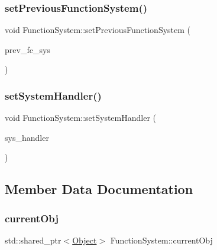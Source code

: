 \mbox{\label{classFunctionSystem_a2304a8ecdf5ddad124779b75be69f4a1}} 
\subsubsection{\texorpdfstring{set\+Previous\+Function\+System()}{setPreviousFunctionSystem()}}
{\footnotesize\ttfamily void Function\+System\+::set\+Previous\+Function\+System (\begin{DoxyParamCaption}\item[{\hyperlink{classFunctionSystem}{Function\+System} $\ast$}]{prev\+\_\+fc\+\_\+sys }\end{DoxyParamCaption})}

\mbox{\label{classFunctionSystem_a7924e14b5794c595167aa9d547182883}} 
\subsubsection{\texorpdfstring{set\+System\+Handler()}{setSystemHandler()}}
{\footnotesize\ttfamily void Function\+System\+::set\+System\+Handler (\begin{DoxyParamCaption}\item[{\hyperlink{classSystemHandler}{System\+Handler} $\ast$}]{sys\+\_\+handler }\end{DoxyParamCaption})}



\subsection{Member Data Documentation}
\mbox{\label{classFunctionSystem_a59f2a49d91338ced0a79d3898412fcaf}} 
\subsubsection{\texorpdfstring{current\+Obj}{currentObj}}
{\footnotesize\ttfamily std\+::shared\+\_\+ptr$<$\hyperlink{classObject}{Object}$>$ Function\+System\+::current\+Obj}

